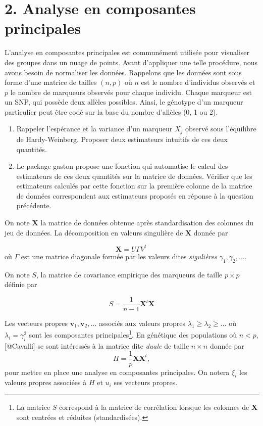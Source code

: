 \documentclass[11pt,]{article}
\begin{document}
\section{2. Analyse en composantes
principales}\label{analyse-en-composantes-principales}

L'analyse en composantes principales est communément utilisée pour
visualiser des groupes dans un nuage de points. Avant d'appliquer une
telle procédure, nous avons besoin de normaliser les données. Rappelons
que les données sont sous forme d'une matrice de tailles \((n,p)\) où
\(n\) est le nombre d'individus observés et \(p\) le nombre de marqueurs
observés pour chaque individu. Chaque marqueur est un SNP, qui possède
deux allèles possibles. Ainsi, le génotype d'un marqueur particulier
peut être codé sur la base du nombre d'allèles (0, 1 ou 2).

\begin{enumerate}
\def\labelenumi{\alph{enumi}.}
\item
  Rappeler l'espérance et la variance d'un marqueur \(X_j\) observé sous
  l'équilibre de Hardy-Weinberg. Proposer deux estimateurs intuitifs de
  ces deux quantités.
\item
  Le package \textsf{gaston} propose une fonction qui automatise le
  calcul des estimateurs de ces deux quantités sur la matrice de
  données. Vérifier que les estimateurs calculés par cette fonction sur
  la première colonne de la matrice de données correspondent aux
  estimateurs proposés en réponse à la question précédente.
\end{enumerate}

On note \(\mathbf X\) la matrice de données obtenue après
standardisation des colonnes du jeu de données. La décomposition en
valeurs singulière de \(\mathbf X\) donnée par

\[\mathbf X = U \Gamma V^t \,\] où \(\Gamma\) est une matrice diagonale
formée par les valeurs dites \emph{sigulières}
\(\gamma_1, \gamma_2,\ldots\).

On note \(S\), la matrice de covariance empirique des marqueurs de
taille \(p \times p\) définie par

\[S = \frac{1}{n-1} \mathbf X^t \mathbf X\]

Les vecteurs propres \(\mathbf v_1, \mathbf v_2, \ldots\) associés aux
valeurs propres \(\lambda_1 \ge \lambda_2 \ge \ldots\) où
\(\lambda_i = \gamma_i^2\) sont les composantes principales\footnote{La
  matrice \(S\) correspond à la matrice de corrélation lorsque les
  colonnes de \(\mathbf X\) sont centrées et réduites (standardisées).}.
En génétique des populations où \(n < p\), {[}@Cavalli{]} se sont
intéressés à la matrice dite \emph{duale} de taille \(n\times n\) donnée
par \[H = \frac{1}{p} \mathbf X \mathbf X^t,\] pour mettre en place une
analyse en composantes principales. On notera \(\xi_i\) les valeurs
propres associées à \(H\) et \(u_i\) ses vecteurs propres.
\end{document}
